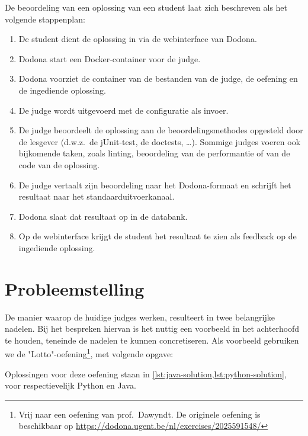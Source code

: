 De beoordeling van een oplossing van een student laat zich beschreven als het volgende stappenplan:

\begin{enumerate}
    \item De student dient de oplossing in via de webinterface van Dodona.
    \item Dodona start een Docker-container voor de judge.
    \item Dodona voorziet de container van de bestanden van de judge, de oefening en de ingediende oplossing.
    \item De judge wordt uitgevoerd met de configuratie als invoer.
    \item De judge beoordeelt de oplossing aan de beoordelingsmethodes opgesteld door de lesgever (d.w.z.\ de jUnit-test, de doctests, \ldots).
    Sommige judges voeren ook bijkomende taken, zoals linting, beoordeling van de performantie of  van de code van de oplossing.
    \item De judge vertaalt zijn beoordeling naar het Dodona-formaat en schrijft het resultaat naar het standaarduitvoerkanaal.
    \item Dodona slaat dat resultaat op in de databank.
    \item Op de webinterface krijgt de student het resultaat te zien als feedback op de ingediende oplossing.
\end{enumerate}



\section{Probleemstelling}\label{sec:probleemstelling}

De manier waarop de huidige judges werken, resulteert in twee belangrijke nadelen.
Bij het bespreken hiervan is het nuttig een voorbeeld in het achterhoofd te houden, teneinde de nadelen te kunnen concretiseren.
Als voorbeeld gebruiken we de "Lotto"-oefening\footnote{Vrij naar een oefening van prof.\ Dawyndt. De originele oefening is beschikbaar op \url{https://dodona.ugent.be/nl/exercises/2025591548/}}, met volgende opgave:

\begin{quote}
\end{quote}

Oplossingen voor deze oefening staan in \cref{lst:java-solution,lst:python-solution}, voor respectievelijk Python en Java.

